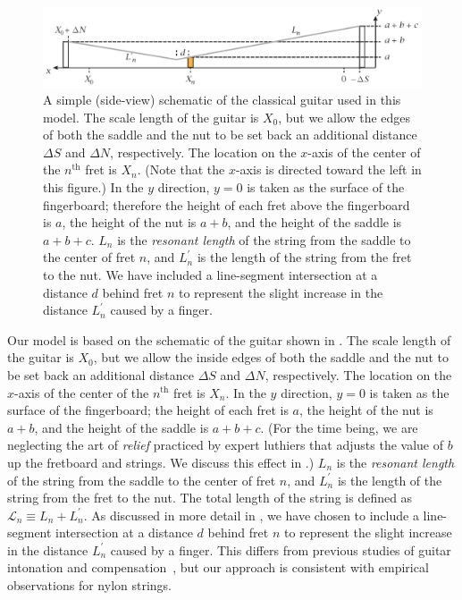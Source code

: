  \begin{figure}
  \centering
  \includegraphics[width=7.0in]{../figures/fretting_schematic}
  \caption{\label{fig:guitar_schematic} A simple (side-view) schematic of the classical guitar used in this model. The scale length of the guitar is $X_0$, but we allow the edges of both the saddle and the nut to be set back an additional distance $\Delta S$ and $\Delta N$, respectively. The location on the $x$-axis of the center of the $n^\textrm{th}$ fret is $X_n$. (Note that the $x$-axis is directed toward the left in this figure.) In the $y$ direction, $y = 0$ is taken as the surface of the fingerboard; therefore the height of each fret above the fingerboard is $a$, the height of the nut is $a + b$, and the height of the saddle is $a + b + c$. $L_n$ is the \emph{resonant length} of the string from the saddle to the center of fret $n$, and $L^\prime_n$ is the length of the string from the fret to the nut. We have included a line-segment intersection at a distance $d$ behind fret $n$ to represent the slight increase in the distance $L_n^\prime$ caused by a finger.}
 \end{figure}

Our model is based on the schematic of the guitar shown in . The scale length of the guitar is $X_0$, but we allow the inside edges of both the saddle and the nut to be set back an additional distance $\Delta S$ and $\Delta N$, respectively. The location on the $x$-axis of the center of the $n^\textrm{th}$ fret is $X_n$. In the $y$ direction, $y = 0$ is taken as the surface of the fingerboard; the height of each fret is $a$, the height of the nut is $a + b$, and the height of the saddle is $a + b + c$. (For the time being, we are neglecting the art of \emph{relief} practiced by expert luthiers that adjusts the value of $b$ up the fretboard and strings. We discuss this effect in .) $L_n$ is the \emph{resonant length} of the string from the saddle to the center of fret $n$, and $L^\prime_n$ is the length of the string from the fret to the nut. The total length of the string is defined as $\mathcal{L}_n \equiv L_n + L^\prime_n$. As discussed in more detail in , we have chosen to include a line-segment intersection at a distance $d$ behind fret $n$ to represent the slight increase in the distance $L_n^\prime$ caused by a finger. This differs from previous studies of guitar intonation and compensation~\cite{ref:byers1996cgi,ref:varieschi2010icf}, but our approach is consistent with empirical observations for nylon strings.


